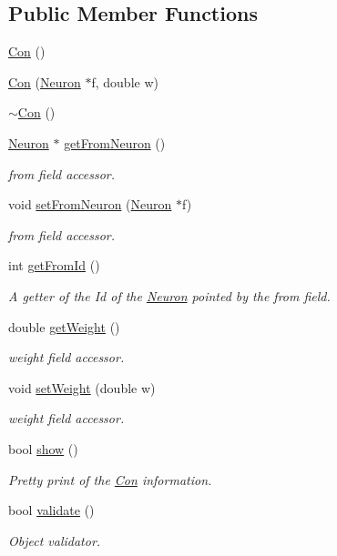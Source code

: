 \subsection*{Public Member Functions}
\begin{DoxyCompactItemize}
\item 
\hyperlink{class_con_a61621054cc1ee979385c81207ee0bceb}{Con} ()
\item 
\hyperlink{class_con_ab2dab438086fc1bb26755dfecb2d2476}{Con} (\hyperlink{class_neuron}{Neuron} $\ast$f, double w)
\item 
\hyperlink{class_con_a703b044611253c7a0a9e057ed62a3d22}{$\sim$Con} ()
\item 
\hyperlink{class_neuron}{Neuron} $\ast$ \hyperlink{class_con_a970a74ffcba9433d6f383ecab398f25f}{getFromNeuron} ()
\begin{DoxyCompactList}\small\item\em from field accessor. \end{DoxyCompactList}\item 
void \hyperlink{class_con_a19ca0a1d257a3f002693a441db03aeb4}{setFromNeuron} (\hyperlink{class_neuron}{Neuron} $\ast$f)
\begin{DoxyCompactList}\small\item\em from field accessor. \end{DoxyCompactList}\item 
int \hyperlink{class_con_aad72314592bebdcae6c68a67d2b4a505}{getFromId} ()
\begin{DoxyCompactList}\small\item\em A getter of the Id of the \hyperlink{class_neuron}{Neuron} pointed by the from field. \end{DoxyCompactList}\item 
double \hyperlink{class_con_a385c5bf6eb9e2ffc94c5b427c287ccb2}{getWeight} ()
\begin{DoxyCompactList}\small\item\em weight field accessor. \end{DoxyCompactList}\item 
void \hyperlink{class_con_aa9b30bb7eda5c5578d11a65977968d38}{setWeight} (double w)
\begin{DoxyCompactList}\small\item\em weight field accessor. \end{DoxyCompactList}\item 
bool \hyperlink{class_con_ab85838575b5e01f3b8073136f2102922}{show} ()
\begin{DoxyCompactList}\small\item\em Pretty print of the \hyperlink{class_con}{Con} information. \end{DoxyCompactList}\item 
bool \hyperlink{class_con_af5f836a7b0988b3d9113589b2959d5e6}{validate} ()
\begin{DoxyCompactList}\small\item\em Object validator. \end{DoxyCompactList}\end{DoxyCompactItemize}

